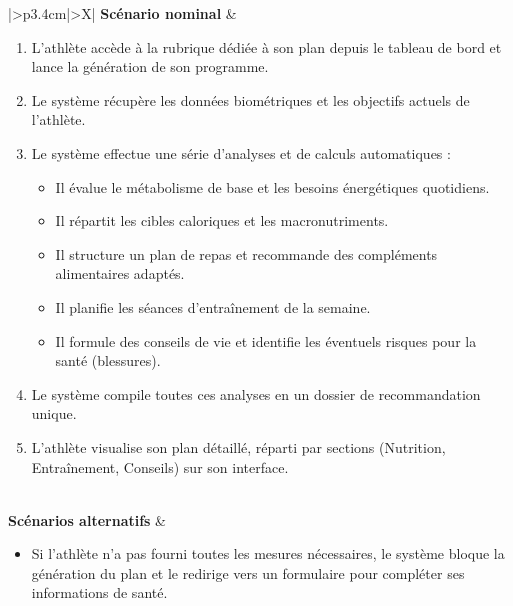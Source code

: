 ﻿\documentclass[a4paper,12pt]{report}
\begin{document}
\begin{table}[H]
\begin{tabularx}{\textwidth}{|>{\RaggedRight\arraybackslash}p{3.4cm}|>{\RaggedRight\arraybackslash}X|}
                \textbf{Scénario nominal} &
                \begin{minipage}[t]{\linewidth}
                \vspace{2pt}
                \begin{enumerate}[label=\arabic*., leftmargin=*, topsep=0pt, itemsep=1pt]
                    \item L'athlète accède à la rubrique dédiée à son plan depuis le tableau de bord et lance la génération de son programme.
                        \item Le système récupère les données biométriques et les objectifs actuels de l'athlète.
                            \item Le système effectue une série d'analyses et de calculs automatiques :
                                \begin{itemize}[leftmargin=*, topsep=1pt, itemsep=1pt]
                                        \item Il évalue le métabolisme de base et les besoins énergétiques quotidiens.
                                                \item Il répartit les cibles caloriques et les macronutriments.
                                                        \item Il structure un plan de repas et recommande des compléments alimentaires adaptés.
\item Il planifie les séances d'entraînement de la semaine.
\item Il formule des conseils de vie et identifie les éventuels risques pour la santé (blessures).
\end{itemize}
\item Le système compile toutes ces analyses en un dossier de recommandation unique.
\item L'athlète visualise son plan détaillé, réparti par sections (Nutrition, Entraînement, Conseils) sur son interface.
 \end{enumerate}
\vspace{2pt}
\end{minipage} \\
\hline
 \textbf{Scénarios alternatifs} &
 \begin{minipage}[t]{\linewidth}
 \vspace{2pt}
\begin{itemize}[leftmargin=*, topsep=0pt, itemsep=1pt]
\item  Si l'athlète n'a pas fourni toutes les mesures nécessaires, le système bloque la génération du plan et le redirige vers un formulaire pour compléter ses informations de santé.

\end{itemize}
\end{minipage}
\end{tabularx}
\end{table}
\end{document}
